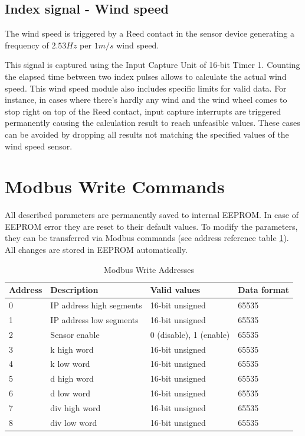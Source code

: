 \subsection{Index signal - Wind speed}
The wind speed is triggered by a Reed contact in the sensor device generating a frequency of $2.53 Hz$ per $1 m/s$ wind speed.

This signal is captured using the Input Capture Unit of 16-bit Timer 1. Counting the elapsed time between two index pulses allows to calculate the actual wind speed. This wind speed module also includes specific limits for valid data. For instance, in cases where there's hardly any wind and the wind wheel comes to stop right on top of the Reed contact, input capture interrupts are triggered permanently causing the calculation result to reach unfeasible values. These cases can be avoided by dropping all results not matching the specified values of the wind speed sensor.

\section{Modbus Write Commands}
All described parameters are permanently saved to internal EEPROM. In case of EEPROM error they are reset to their default values. To modify the parameters, they can be transferred via Modbus commands (see address reference table \ref{tab:modbus_write}). All changes are stored in EEPROM automatically.

\begin{table}[ht]
    \label{tab:modbus_write}
    \centering
    \begin{tabular}{|l|l|l|l|}
    \hline \textbf{Address} & \textbf{Description} & \textbf{Valid values} & \textbf{Data format} \\ 
    \hline
    \hline 0 & IP address high segments & 16-bit unsigned & 65535 \\ 
    \hline 1 & IP address low segments & 16-bit unsigned & 65535 \\ 
    \hline 2 & Sensor enable & 0 (disable), 1 (enable) & 65535 \\ 
    \hline 3 & k high word & 16-bit unsigned & 65535 \\ 
    \hline 4 & k low word & 16-bit unsigned & 65535 \\ 
    \hline 5 & d high word & 16-bit unsigned & 65535 \\ 
    \hline 6 & d low word & 16-bit unsigned & 65535 \\ 
    \hline 7 & div high word & 16-bit unsigned & 65535 \\ 
    \hline 8 & div low word & 16-bit unsigned & 65535 \\ 
    \hline 
    \end{tabular}
    \caption{Modbus Write Addresses}
\end{table}

